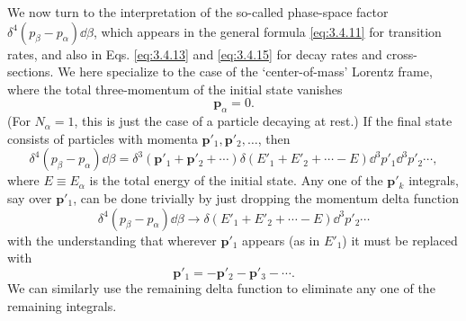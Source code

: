 We now turn to the interpretation of the so-called phase-space factor
$\delta^4(p_\beta-p_\alpha)\dd\beta$, which appears in the general formula \eqref{eq:3.4.11} for transition
rates, and also in Eqs. \eqref{eq:3.4.13} and \eqref{eq:3.4.15} for decay rates and cross-sections. We here
specialize to the case of the `center-of-mass' Lorentz frame, where the total three-momentum
of the initial state vanishes
\begin{equation}
 \mathbf{p}_\alpha=0.
 \tag{3.4.19}\label{eq:3.4.19}
\end{equation}
(For $N_\alpha=1$, this is just the case of a particle decaying at rest.) If the final state
consists of particles with momenta $\mathbf{p}'_1,\mathbf{p}'_2,\ldots$, then
\begin{equation}
 \delta^4(p_\beta-p_\alpha)\dd\beta
 =\delta^3(\mathbf{p}'_1+\mathbf{p}'_2+\cdots)
 \delta(E'_1+E'_2+\cdots-E)\dd^3p'_1\dd^3p'_2\cdots,
 \tag{3.4.20}\label{eq:3.4.20}
\end{equation}
where $E\equiv E_\alpha$ is the total energy of the initial state. Any one of the
$\mathbf{p}'_k$ integrals, say over $\mathbf{p}'_1$, can be done trivially by just dropping the
momentum delta function
\begin{equation}
 \delta^4(p_\beta-p_\alpha)\dd\beta\longrightarrow
 \delta(E'_1+E'_2+\cdots-E)\dd^3p'_2\cdots
 \tag{3.4.21}\label{eq:3.4.21}
\end{equation}
with the understanding that wherever $\mathbf{p}'_1$ appears (as in $E'_1$) it must be replaced
with
\begin{equation}
 \mathbf{p}'_1=-\mathbf{p}'_2-\mathbf{p}'_3-\cdots.
 \tag{3.4.22}\label{eq:3.4.22}
\end{equation}
We can similarly use the remaining delta function to eliminate any one of the remaining integrals.

